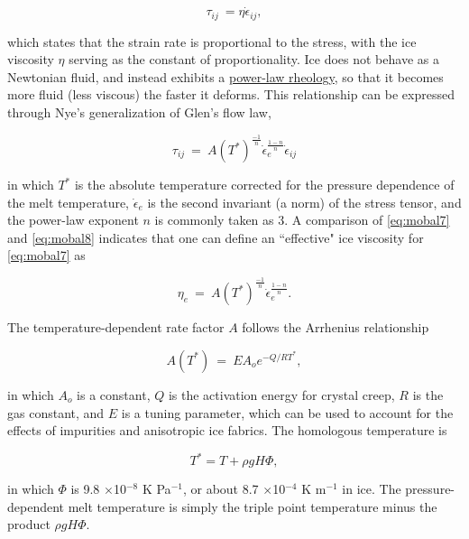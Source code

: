 \begin{equation}
\tau_{ij}~=\eta \dot{\epsilon}_{ij},
\label{eq:mobal7}
\end{equation}

\noindent
which states that the strain rate is proportional to the stress, with the ice viscosity $\eta$ serving as the constant of proportionality.
Ice does not behave as a Newtonian fluid, and instead exhibits a \href{http://en.wikipedia.org/wiki/Power-law_fluid}{power-law rheology}, 
so that it becomes more fluid (less viscous) the faster it deforms. This relationship can be expressed through Nye's generalization of Glen's 
flow law, 

\begin{equation}
\tau_{ij}~=~A(T^{*})^{\frac{-1}{n}} \dot{\epsilon}_{e}^{\frac{1-n}{n}} \dot{\epsilon}_{ij} 
\label{eq:mobal8}
\end{equation}

\noindent
in which $T^{*}$ is the absolute temperature corrected for the pressure dependence of the melt temperature, $\dot{\epsilon}_{e}$ is the 
second invariant (a norm) of the stress tensor, and the power-law exponent $n$ is commonly taken as 3. A comparison of 
\eqref{eq:mobal7} and \eqref{eq:mobal8} indicates that one can define an ``effective" ice viscosity for \eqref{eq:mobal7} as

\begin{equation}
\eta_{e}~=~A(T^{*})^{\frac{-1}{n}} \dot{\epsilon}_{e}^{\frac{1-n}{n}}.
\label{eq:mobal9}
\end{equation}

The temperature-dependent rate factor $A$ follows the Arrhenius relationship

\begin{equation}
A\left( T^{*}\right)~=~E A_{o}e^{-Q/RT^{*}},
\label{eq:mobal10}
\end{equation}

\noindent
in which $A_{o}$ is a constant, $Q$ is the activation energy for crystal creep, $R$ is the gas constant, and $E$ is a tuning 
parameter, which can be used to account for the effects of impurities and anisotropic ice fabrics. The homologous temperature is

\begin{equation}
T^{*}=T+\rho g H \Phi,
\label{eq:mobal11}
\end{equation}

\noindent
in which $\Phi$ is 9.8 $\times$10$^{-8}$ K Pa$^{-1}$, or about 8.7 $\times$10$^{-4}$ K m$^{-1}$ in ice. The pressure-dependent melt 
temperature is simply the triple point temperature minus the product $\rho g H \Phi$.
